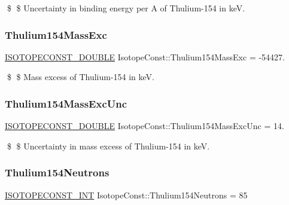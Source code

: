 \$ \$ Uncertainty in binding energy per A of Thulium-\/154 in keV. \mbox{\label{group___isotope_const-_thulium-_tm154_ga7c1dc1cee9d60ea86b33acd907289c6c}} 
\subsubsection{\texorpdfstring{Thulium154\+Mass\+Exc}{Thulium154MassExc}}
{\footnotesize\ttfamily \mbox{\hyperlink{group___isotope_const-_macros_ga8f45a7272ce02c0b4c65c44636ed719a}{I\+S\+O\+T\+O\+P\+E\+C\+O\+N\+S\+T\+\_\+\+D\+O\+U\+B\+LE}} Isotope\+Const\+::\+Thulium154\+Mass\+Exc = -\/54427.}

\$ \$ Mass excess of Thulium-\/154 in keV. \mbox{\label{group___isotope_const-_thulium-_tm154_gaf028fbe5b44eb9d5e6b5947b4575254f}} 
\subsubsection{\texorpdfstring{Thulium154\+Mass\+Exc\+Unc}{Thulium154MassExcUnc}}
{\footnotesize\ttfamily \mbox{\hyperlink{group___isotope_const-_macros_ga8f45a7272ce02c0b4c65c44636ed719a}{I\+S\+O\+T\+O\+P\+E\+C\+O\+N\+S\+T\+\_\+\+D\+O\+U\+B\+LE}} Isotope\+Const\+::\+Thulium154\+Mass\+Exc\+Unc = 14.}

\$ \$ Uncertainty in mass excess of Thulium-\/154 in keV. \mbox{\label{group___isotope_const-_thulium-_tm154_ga8c69617df958dc5798064086552e22e3}} 
\subsubsection{\texorpdfstring{Thulium154\+Neutrons}{Thulium154Neutrons}}
{\footnotesize\ttfamily \mbox{\hyperlink{group___isotope_const-_macros_ga5f18360b3e99483a35c32d789e62621c}{I\+S\+O\+T\+O\+P\+E\+C\+O\+N\+S\+T\+\_\+\+I\+NT}} Isotope\+Const\+::\+Thulium154\+Neutrons = 85}

